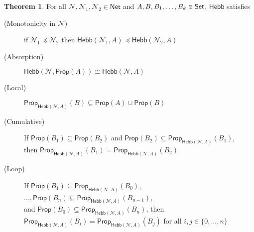 \documentclass[letterpaper]{article}
\theoremstyle{definition}
\newtheorem{theorem}{Theorem}
\newcommand{\Set}{\mbox{\sf Set}}
\newcommand{\set}[1]{\{ #1 \}}
\newcommand{\Prop}{\textsf{Prop}}
\newcommand{\Inc}{\textsf{Hebb}}
\newcommand{\AllNets}{\mathsf{Net}}
\newcommand{\Net}{\mathcal{N}}
\begin{document}
\begin{theorem}
For all $\Net, \Net_1, \Net_2 \in \AllNets$ and $A, B, B_1, \ldots, B_k \in \Set$, $\Inc$ satisfies
\begin{description}
    \item[(Monotonicity in $\Net$)] if ${\Net_1 \preceq \Net_2}$
    then ${\Inc(\Net_1, A) \preceq \Inc(\Net_2, A)}$

    \item[(Absorption)]
    $\Inc(\Net, \Prop(A)) \cong \Inc(\Net, A)$
    
    \item[(Local)]
    $\Prop_{\Inc(\Net, A)}(B) \subseteq \Prop(A) \cup \Prop(B)$
    
    \item[(Cumulative)] If ${\Prop(B_1) \subseteq \Prop(B_2)}$ and ${\Prop(B_2) \subseteq \Prop_{\Inc(\Net, A)}(B_1)}$,\\
    then $\Prop_{\Inc(\Net, A)}(B_1) = \Prop_{\Inc(\Net, A)}(B_2)$
    
    \item[(Loop)] If ${\Prop(B_1) \subseteq \Prop_{\Inc(\Net, A)}(B_0)}$,
    $\ldots, {\Prop(B_n) \subseteq \Prop_{\Inc(\Net, A)}(B_{n-1})}$,\\
    and 
    ${\Prop(B_0) \subseteq \Prop_{\Inc(\Net, A)}(B_n)}$,
    then ${\Prop_{\Inc(\Net, A)}(B_i) = \Prop_{\Inc(\Net, A)}(B_j)}$
    for all $i, j \in \set{0, \ldots, n}$
\end{description}
\label{thm:inc-props}
\end{theorem}
\end{document}
